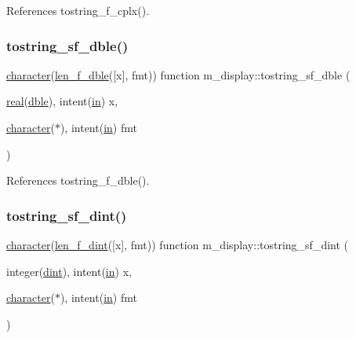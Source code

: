 References tostring\+\_\+f\+\_\+cplx().

\mbox{\label{namespacem__display_a41a473fe1569b4f3b44cc3f9b1f5b1ce}} 
\subsubsection{\texorpdfstring{tostring\+\_\+sf\+\_\+dble()}{tostring\_sf\_dble()}}
{\footnotesize\ttfamily \hyperlink{option__stopwatch_83_8txt_abd4b21fbbd175834027b5224bfe97e66}{character}(\hyperlink{namespacem__display_aa013a639d5b0f7e40b627c9d712693f0}{len\+\_\+f\+\_\+dble}(\mbox{[}x\mbox{]}, fmt)) function m\+\_\+display\+::tostring\+\_\+sf\+\_\+dble (\begin{DoxyParamCaption}\item[{\hyperlink{read__watch_83_8txt_abdb62bde002f38ef75f810d3a905a823}{real}(\hyperlink{namespacem__display_a46d90b75b6ccef7ccade133e5847e815}{dble}), intent(\hyperlink{M__journal_83_8txt_afce72651d1eed785a2132bee863b2f38}{in})}]{x,  }\item[{\hyperlink{option__stopwatch_83_8txt_abd4b21fbbd175834027b5224bfe97e66}{character}($\ast$), intent(\hyperlink{M__journal_83_8txt_afce72651d1eed785a2132bee863b2f38}{in})}]{fmt }\end{DoxyParamCaption})\hspace{0.3cm}{\ttfamily [private]}}



References tostring\+\_\+f\+\_\+dble().

\mbox{\label{namespacem__display_aa7d1fb61fc22bddb9232eaa13aaaa43f}} 
\subsubsection{\texorpdfstring{tostring\+\_\+sf\+\_\+dint()}{tostring\_sf\_dint()}}
{\footnotesize\ttfamily \hyperlink{option__stopwatch_83_8txt_abd4b21fbbd175834027b5224bfe97e66}{character}(\hyperlink{namespacem__display_a6a2709cf5f243ee492f223b40c6b5143}{len\+\_\+f\+\_\+dint}(\mbox{[}x\mbox{]}, fmt)) function m\+\_\+display\+::tostring\+\_\+sf\+\_\+dint (\begin{DoxyParamCaption}\item[{integer(\hyperlink{namespacem__display_a73f772e9702cad6f40b78364fde2c7cd}{dint}), intent(\hyperlink{M__journal_83_8txt_afce72651d1eed785a2132bee863b2f38}{in})}]{x,  }\item[{\hyperlink{option__stopwatch_83_8txt_abd4b21fbbd175834027b5224bfe97e66}{character}($\ast$), intent(\hyperlink{M__journal_83_8txt_afce72651d1eed785a2132bee863b2f38}{in})}]{fmt }\end{DoxyParamCaption})\hspace{0.3cm}{\ttfamily [private]}}



